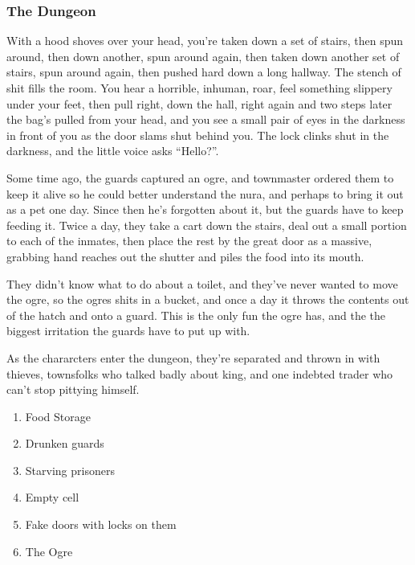 \begin{multicols}{2}
\subsubsection{The Dungeon}

\begin{boxtext}

	With a hood shoves over your head, you're taken down a set of stairs, then spun around, then down another, spun around again, then taken down another set of stairs, spun around again, then pushed hard down a long hallway.  The stench of shit fills the room.  You hear a horrible, inhuman, roar, feel something slippery under your feet, then pull right, down the hall, right again and two steps later the bag's pulled from your head, and you see a small pair of eyes in the darkness in front of you as the door slams shut behind you.  The lock clinks shut in the darkness, and the little voice asks ``Hello?''.

\end{boxtext}

Some time ago, the guards captured an ogre, and \gls{townmaster} ordered them to keep it alive so he could better understand the nura, and perhaps to bring it out as a pet one day.  Since then he's forgotten about it, but the guards have to keep feeding it.  Twice a day, they take a cart down the stairs, deal out a small portion to each of the inmates, then place the rest by the great door as a massive, grabbing hand reaches out the shutter and piles the food into its mouth.

\noindent

They didn't know what to do about a toilet, and they've never wanted to move the ogre, so the ogres shits in a bucket, and once a day it throws the contents out of the hatch and onto a guard.  This is the only fun the ogre has, and the the biggest irritation the guards have to put up with.

As the chararcters enter the dungeon, they're separated and thrown in with thieves, townsfolks who talked badly about \gls{king}, and one indebted trader who can't stop pittying himself.

\begin{enumerate}

	\item{Food Storage}
	\item{Drunken guards}
	\item{Starving prisoners}
	\item{Empty cell}
	\item{Fake doors with locks on them}
	\item{The Ogre}


\end{enumerate}
\end{multicols}
